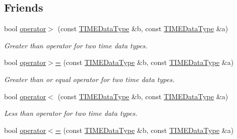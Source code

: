 \subsection*{Friends}
\begin{DoxyCompactItemize}
\item 
bool \hyperlink{structpc__emulator_1_1TIMEDataType_af9d5c607c8c0681a9ffe7ff95cde1191}{operator$>$} (const \hyperlink{structpc__emulator_1_1TIMEDataType}{T\+I\+M\+E\+Data\+Type} \&b, const \hyperlink{structpc__emulator_1_1TIMEDataType}{T\+I\+M\+E\+Data\+Type} \&a)\hypertarget{structpc__emulator_1_1TIMEDataType_af9d5c607c8c0681a9ffe7ff95cde1191}{}\label{structpc__emulator_1_1TIMEDataType_af9d5c607c8c0681a9ffe7ff95cde1191}

\begin{DoxyCompactList}\small\item\em Greater than operator for two time data types. \end{DoxyCompactList}\item 
bool \hyperlink{structpc__emulator_1_1TIMEDataType_a7525cc80be8c2d5d3c4b4e1104b669ae}{operator$>$=} (const \hyperlink{structpc__emulator_1_1TIMEDataType}{T\+I\+M\+E\+Data\+Type} \&b, const \hyperlink{structpc__emulator_1_1TIMEDataType}{T\+I\+M\+E\+Data\+Type} \&a)\hypertarget{structpc__emulator_1_1TIMEDataType_a7525cc80be8c2d5d3c4b4e1104b669ae}{}\label{structpc__emulator_1_1TIMEDataType_a7525cc80be8c2d5d3c4b4e1104b669ae}

\begin{DoxyCompactList}\small\item\em Greater than or equal operator for two time data types. \end{DoxyCompactList}\item 
bool \hyperlink{structpc__emulator_1_1TIMEDataType_afb21819d5d8dfbd32816fd5d4d269698}{operator$<$} (const \hyperlink{structpc__emulator_1_1TIMEDataType}{T\+I\+M\+E\+Data\+Type} \&b, const \hyperlink{structpc__emulator_1_1TIMEDataType}{T\+I\+M\+E\+Data\+Type} \&a)\hypertarget{structpc__emulator_1_1TIMEDataType_afb21819d5d8dfbd32816fd5d4d269698}{}\label{structpc__emulator_1_1TIMEDataType_afb21819d5d8dfbd32816fd5d4d269698}

\begin{DoxyCompactList}\small\item\em Less than operator for two time data types. \end{DoxyCompactList}\item 
bool \hyperlink{structpc__emulator_1_1TIMEDataType_a5309b527c21a8293925f1eb169517cd2}{operator$<$=} (const \hyperlink{structpc__emulator_1_1TIMEDataType}{T\+I\+M\+E\+Data\+Type} \&b, const \hyperlink{structpc__emulator_1_1TIMEDataType}{T\+I\+M\+E\+Data\+Type} \&a)\hypertarget{structpc__emulator_1_1TIMEDataType_a5309b527c21a8293925f1eb169517cd2}{}\label{structpc__emulator_1_1TIMEDataType_a5309b527c21a8293925f1eb169517cd2}


\end{DoxyCompactItemize}
